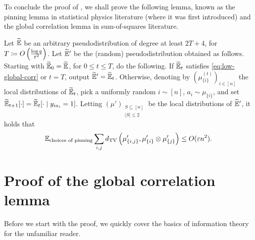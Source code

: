 \documentclass{article}
\begin{document}
To conclude the proof of , we shall prove the following lemma, known as the pinning lemma in statistical physics literature (where it was first introduced) and the global correlation lemma in sum-of-squares literature.

\begin{flem}
	\label{lem:global-corr-lem}
	Let $\widetilde{\mathbb{E}}$ be an arbitrary pseudodistribution of degree at least $2T + 4$, for $T \coloneqq O\left( \frac{\log q}{\varepsilon^2} \right)$. Let $\widetilde{\mathbb{E}}'$ be the (random) pseudodistribution obtained as follows. Starting with $\widetilde{\mathbb{E}}_0 = \widetilde{\mathbb{E}}$, for $0 \le t \le T$, do the following. If $\widetilde{\mathbb{E}}_{t}$ satisfies \eqref{eq:low-global-corr} or $t = T$, output $\widetilde{\mathbb{E}}' = \widetilde{\mathbb{E}}_{t}$. Otherwise, denoting by $\left(\mu^{(t)}_{\{i\}}\right)_{i \in [n]}$ the local distributions of $\widetilde{\mathbb{E}}_t$, pick a uniformly random $i \sim [n]$, $a_i \sim \mu_{\{i\}}$, and set $\widetilde{\mathbb{E}}_{t+1}[\cdot] = \widetilde{\mathbb{E}}_t[\cdot \mid y_{ia_i} = 1]$.
	Letting $(\mu')_{\substack{S \subseteq [n] \\ |S| \le 2}}$ be the local distributions of $\widetilde{\mathbb{E}}'$, it holds that
	\[ \mathbb{E}_{\text{choices of pinning}} \sum_{i,j} d_{\mathrm{TV}}\left( \mu'_{\{i,j\}} , \mu'_{\{i\}} \otimes \mu'_{\{j\}} \right)  \leq O(\varepsilon n^2). \]
\end{flem}

\section{Proof of the global correlation lemma}

Before we start with the proof, we quickly cover the basics of information theory for the unfamiliar reader.
\end{document}
